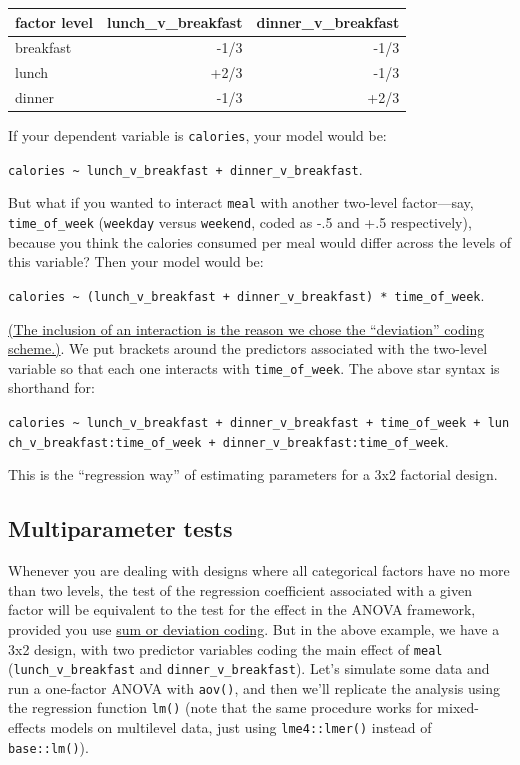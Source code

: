 \documentclass[]{book}
\begin{document}
\begin{tabular}{l|r|r}
\hline
factor level & lunch\_v\_breakfast & dinner\_v\_breakfast\\
\hline
breakfast & -1/3 & -1/3\\
\hline
lunch & +2/3 & -1/3\\
\hline
dinner & -1/3 & +2/3\\
\hline
\end{tabular}

If your dependent variable is \texttt{calories}, your model would be:

\texttt{calories\ \textasciitilde{}\ lunch\_v\_breakfast\ +\ dinner\_v\_breakfast}.

But what if you wanted to interact \texttt{meal} with another two-level factor---say, \texttt{time\_of\_week} (\texttt{weekday} versus \texttt{weekend}, coded as -.5 and +.5 respectively), because you think the calories consumed per meal would differ across the levels of this variable? Then your model would be:

\texttt{calories\ \textasciitilde{}\ (lunch\_v\_breakfast\ +\ dinner\_v\_breakfast)\ *\ time\_of\_week}.

\href{interactions.html\#coding-schemes-for-categorical-variables}{(The inclusion of an interaction is the reason we chose the ``deviation'' coding scheme.)}. We put brackets around the predictors associated with the two-level variable so that each one interacts with \texttt{time\_of\_week}. The above star syntax is shorthand for:

\texttt{calories\ \textasciitilde{}\ lunch\_v\_breakfast\ +\ dinner\_v\_breakfast\ +\ time\_of\_week\ +\ lunch\_v\_breakfast:time\_of\_week\ +\ dinner\_v\_breakfast:time\_of\_week}.

This is the ``regression way'' of estimating parameters for a 3x2 factorial design.

\hypertarget{multiparameter-tests}{%
\subsection{Multiparameter tests}\label{multiparameter-tests}}

Whenever you are dealing with designs where all categorical factors have no more than two levels, the test of the regression coefficient associated with a given factor will be equivalent to the test for the effect in the ANOVA framework, provided you use \href{multiple-regression.html\#dealing-with-categorical-predictors}{sum or deviation coding}. But in the above example, we have a 3x2 design, with two predictor variables coding the main effect of \texttt{meal} (\texttt{lunch\_v\_breakfast} and \texttt{dinner\_v\_breakfast}). Let's simulate some data and run a one-factor ANOVA with \texttt{aov()}, and then we'll replicate the analysis using the regression function \texttt{lm()} (note that the same procedure works for mixed-effects models on multilevel data, just using \texttt{lme4::lmer()} instead of \texttt{base::lm()}).
\end{document}
